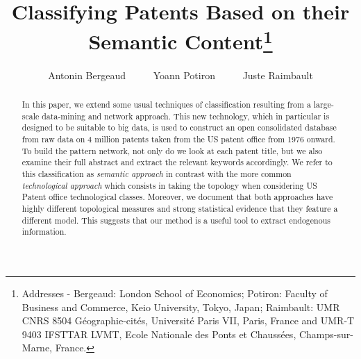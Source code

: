 \documentclass[12pt,twoside,a4paper]{article}
\begin{document}
\title{Classifying Patents Based on their Semantic Content\thanks{%
Addresses - Bergeaud: London School of Economics; Potiron: Faculty of Business and Commerce, Keio University, Tokyo, Japan;
Raimbault: UMR CNRS 8504 G{\'e}ographie-cit{\'e}s, Universit{\'e} Paris VII, Paris, France and UMR-T 9403 IFSTTAR LVMT, Ecole Nationale des Ponts et Chauss{\'e}es, Champs-sur-Marne, France.} \vspace{5mm} }
\author{Antonin Bergeaud \ \ \ \ \ Yoann Potiron
 \ \ \ \ \ Juste Raimbault \bigskip}
\maketitle


\begin{abstract}
In this paper, we extend some usual techniques of classification resulting from a large-scale data-mining and network approach. This new technology, which in particular is designed to be suitable to big data, is used to construct an open consolidated database from raw data on 4 million patents taken from the US patent office from 1976 onward. To build the pattern network, not only do we look at each patent title, but we also examine their full abstract and extract the relevant keywords accordingly. We refer to this classification as \emph{semantic approach} in contrast with the more common \emph{technological approach} which consists in taking the topology when considering US Patent office technological classes. Moreover, we document that both approaches have highly different topological measures and strong statistical evidence that they feature a different model. This suggests that our method is a useful tool to extract endogenous information.    
\end{abstract}


\pagebreak


\end{document}

